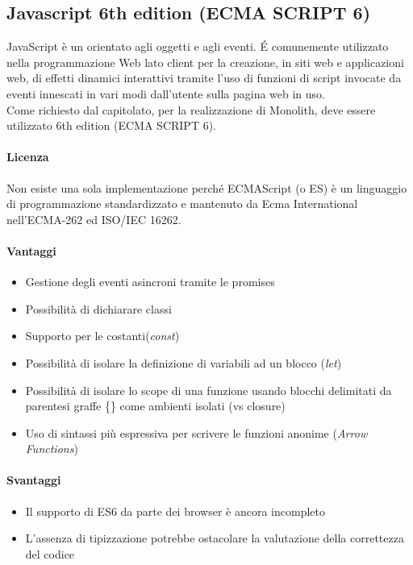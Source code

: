 \subsection{Javascript 6th edition (ECMA SCRIPT 6)}

JavaScript è un  orientato agli oggetti e agli
eventi. \'E comunemente utilizzato nella programmazione Web lato
client per la creazione, in siti web e applicazioni web, di effetti
dinamici interattivi tramite l'uso di funzioni di script invocate da
eventi innescati in vari modi dall'utente sulla pagina web in
uso. \\ Come richiesto dal capitolato, per la realizzazione di
Monolith, deve essere utilizzato  6th edition (ECMA SCRIPT
6). \\ 

\paragraph{Licenza}  
Non esiste una sola implementazione perché ECMAScript (o ES) è un
linguaggio di programmazione standardizzato e mantenuto da Ecma
International nell'ECMA-262 ed ISO/IEC 16262. \\


\paragraph{Vantaggi}
\begin{itemize}
	\item Gestione degli eventi asincroni tramite le promises
	\item Possibilità di dichiarare classi
	\item Supporto per le costanti(\emph{const})
	\item Possibilità di isolare la definizione di variabili ad un blocco (\emph{let})
	\item Possibilità di isolare lo scope di una funzione usando
     blocchi delimitati da parentesi graffe \{\} come ambienti isolati (vs closure)
	\item Uso di sintassi più espressiva per scrivere le funzioni anonime (\emph{Arrow Functions})
	
\end{itemize}

\paragraph{Svantaggi} 
\begin{itemize}
	\item Il supporto di ES6 da parte dei browser è ancora incompleto
	\item L’assenza di tipizzazione potrebbe ostacolare la valutazione della correttezza del codice
\end{itemize}

